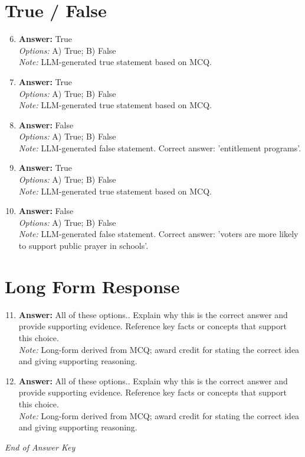 \documentclass[12pt]{article}
\begin{document}
\section*{True / False}
\begin{enumerate}[label=\arabic*.]
\setcounter{enumi}{5}
\item \textbf{Answer:} True
\\ \textit{Options:} A) True; B) False
\\ \textit{Note:} LLM-generated true statement based on MCQ.
\item \textbf{Answer:} True
\\ \textit{Options:} A) True; B) False
\\ \textit{Note:} LLM-generated true statement based on MCQ.
\item \textbf{Answer:} False
\\ \textit{Options:} A) True; B) False
\\ \textit{Note:} LLM-generated false statement. Correct answer: 'entitlement programs'.
\item \textbf{Answer:} True
\\ \textit{Options:} A) True; B) False
\\ \textit{Note:} LLM-generated true statement based on MCQ.
\item \textbf{Answer:} False
\\ \textit{Options:} A) True; B) False
\\ \textit{Note:} LLM-generated false statement. Correct answer: 'voters are more likely to support public prayer in schools'.
\end{enumerate}

\section*{Long Form Response}
\begin{enumerate}[label=\arabic*.]
\setcounter{enumi}{10}
\item \textbf{Answer:} All of these options.. Explain why this is the correct answer and provide supporting evidence. Reference key facts or concepts that support this choice.
\\ \textit{Note:} Long-form derived from MCQ; award credit for stating the correct idea and giving supporting reasoning.
\item \textbf{Answer:} All of these options.. Explain why this is the correct answer and provide supporting evidence. Reference key facts or concepts that support this choice.
\\ \textit{Note:} Long-form derived from MCQ; award credit for stating the correct idea and giving supporting reasoning.
\end{enumerate}

\vfill
\noindent\textit{End of Answer Key}
\end{document}
